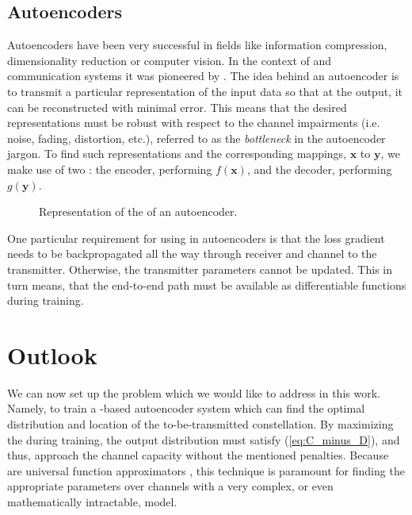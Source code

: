 \subsection{Autoencoders}
Autoencoders have been very successful in fields like information compression, dimensionality reduction or computer vision. In the context of  and communication systems it was pioneered by \citet{O'Shea}. The idea behind an autoencoder is to transmit a particular representation of the input data so that at the output, it can be reconstructed with minimal error. This means that the desired representations must be robust with respect to the channel impairments (i.e. noise, fading, distortion, etc.), referred to as the \textit{bottleneck} in the autoencoder jargon. To find such representations and the corresponding mappings, $\textbf{x}$ to $\textbf{y}$, we make use of two : the encoder, performing $f(\textbf{x})$, and the decoder, performing $g(\textbf{y})$. %

\begin{figure}[h]
\centering

\caption{Representation of the  of an autoencoder.}
\label{fig:autoencoder}
\end{figure}

One particular requirement for using  in autoencoders is that the loss gradient needs to be backpropagated all the way through receiver and channel to the transmitter. Otherwise, the transmitter parameters cannot be updated. This in turn means, that the end-to-end path must be available as differentiable functions during training.
\section{Outlook}
We can now set up the problem which we would like to address in this work. Namely, to train a -based autoencoder system which can find the optimal distribution and location of the  to-be-transmitted constellation. By maximizing the  during training, the output distribution must satisfy (\ref{eq:C_minus_D}), and thus, approach the channel capacity without the mentioned penalties. Because  are universal function approximators \cite{HORNIK1989359}, this technique is paramount for finding the appropriate parameters over channels with a very complex, or even mathematically intractable, model.